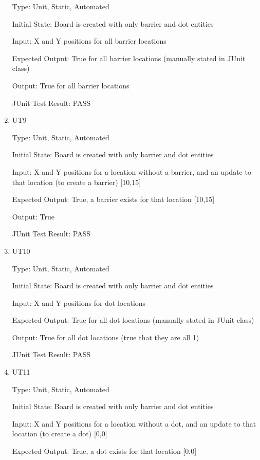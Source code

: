 \documentclass[12pt, titlepage]{article}
\begin{document}
\begin{enumerate}
Type: Unit, Static, Automated
					
Initial State: Board is created with only barrier and dot entities
					
Input: X and Y positions for all barrier locations
					
Expected Output: True for all barrier locations (manually stated in JUnit class)
					
Output: True for all barrier locations

JUnit Test Result: PASS

\item{\label{ut9}{UT9}\\}

Type: Unit, Static, Automated
					
Initial State: Board is created with only barrier and dot entities
					
Input: X and Y positions for a location without a barrier, and an update to that location (to create a barrier) [10,15]
					
Expected Output: True, a barrier exists for that location [10,15]
					
Output: True

JUnit Test Result: PASS

\item{\label{ut10}{UT10}\\}

Type: Unit, Static, Automated
					
Initial State: Board is created with only barrier and dot entities
					
Input: X and Y positions for dot locations
					
Expected Output: True for all dot locations (manually stated in JUnit class)
					
Output: True for all dot locations (true that they are all 1)

JUnit Test Result: PASS

\item{\label{ut11}{UT11}\\}

Type: Unit, Static, Automated
					
Initial State: Board is created with only barrier and dot entities
					
Input: X and Y positions for a location without a dot, and an update to that location (to create a dot) [0,0]
					
Expected Output: True, a dot exists for that location [0,0]
					

\end{enumerate}
\end{document}
